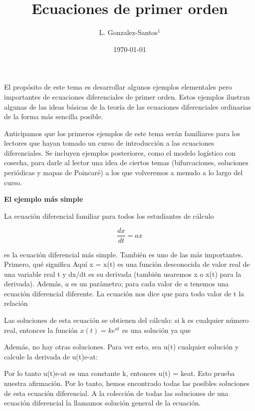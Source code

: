 \documentclass{beamer}
\title[Animales]{Ecuaciones de primer orden}
\author[Adan, Eva, Serpiente]{
L. Gonzalez-Santos$^{1}$}
\institute[EDEN \& HELL]{
  $^{1}$
  Universidad de Edén\\
  Al lado del manzano, Paraíso
  \and
  \texttt{\{$^{1}$eva, $^{2}$adan\}@paraiso.com, $^{3}$serpiente@infierno.com}
}
\date{\today}
\begin{document}
\frame{\titlepage}

\begin{frame}

El propósito de este tema es desarrollar algunos ejemplos elementales pero importantes de ecuaciones diferenciales de primer orden. Estos ejemplos ilustran algunas de las ideas básicas de la teoría de las ecuaciones diferenciales ordinarias de la forma más sencilla posible.

\hfill

Anticipamos que los primeros ejemplos de este tema serán familiares para los lectores que hayan tomado un curso de introducción a las ecuaciones diferenciales. Se incluyen ejemplos posteriores, como el modelo logístico con cosecha, para darle al lector una idea de ciertos temas (bifurcaciones, soluciones periódicas y mapas de Poincaré) a los que volveremos a menudo a lo largo del curso. 


\end{frame}

\begin{frame}

\textbf{El ejemplo más simple}

\hfill

La ecuación diferencial familiar para todos los estudiantes de cálculo

\[
\frac{dx}{dt} = ax
\]

es la ecuación diferencial más simple. También es uno de las más importantes. Primero, qué significa Aquí x = x(t) es una función desconocida de valor real de una variable real t y dx/dt es su derivada (también usaremos x o x(t) para la derivada). Además, $a$ es un parámetro; para cada valor de $a$ tenemos una ecuación diferencial diferente. La ecuación nos dice que para todo valor de t la relación
 
\end{frame}

\begin{frame}

Las soluciones de esta ecuación se obtienen del cálculo: si k es cualquier número real, entonces la función $x(t) = ke^{at}$ es una solución ya que

\hfill

Además, no hay otras soluciones. Para ver esto, sea u(t) cualquier solución y calcule la derivada de u(t)e-at:

\hfill

Por lo tanto u(t)e-at es una constante k, entonces u(t) = keat. Esto prueba nuestra afirmación. Por lo tanto, hemos encontrado todas las posibles soluciones de esta ecuación diferencial. A la colección de todas las soluciones de una ecuación diferencial la llamamos solución general de la ecuación.


\end{frame}
\end{document}
